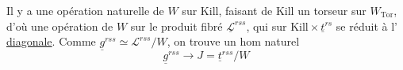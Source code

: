 Il y a une opération naturelle de $W$ sur $\mathrm{Kill}$, faisant de $\mathrm{Kill}$ un torseur sur $W_{\mathrm{Tor}}$, d'où une opération de $W$ sur le produit fibré $\underline{\mathscr L}^{rss}$, qui sur $\mathrm{Kill}\times\underline t^{rs}$ se réduit à l' \uline{diagonale}. Comme $\underline g^{rss}\simeq\mathscr L^{rss}/W$, on trouve un hom naturel
\[
\underline g^{rss}\longrightarrow J=\underline t^{rss}/W
\]
